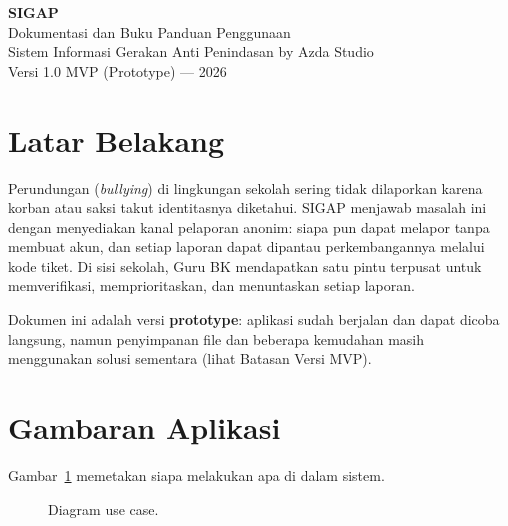 \documentclass[12pt,a4paper]{article}
\begin{document}
\thispagestyle{empty}
\begin{center}
  \vspace*{1cm}
  {\fontsize{44}{48}\selectfont \textbf{SIGAP}}\\[0.5cm]
  {\LARGE Dokumentasi dan Buku Panduan Penggunaan}\\[0.4cm]
  {\large Sistem Informasi Gerakan Anti Penindasan}
  \vfill
  {\large by Azda Studio}\\[0.2cm]
  {\normalsize Versi 1.0 MVP (Prototype) --- 2026}
\end{center}
\clearpage

\tableofcontents
\clearpage

\section{Latar Belakang}
Perundungan (\textit{bullying}) di lingkungan sekolah sering tidak dilaporkan
karena korban atau saksi takut identitasnya diketahui. SIGAP menjawab masalah
ini dengan menyediakan kanal pelaporan anonim: siapa pun dapat melapor tanpa
membuat akun, dan setiap laporan dapat dipantau perkembangannya melalui kode
tiket. Di sisi sekolah, Guru BK mendapatkan satu pintu terpusat untuk
memverifikasi, memprioritaskan, dan menuntaskan setiap laporan.

Dokumen ini adalah versi \textbf{prototype}: aplikasi sudah berjalan dan dapat
dicoba langsung, namun penyimpanan file dan beberapa kemudahan masih
menggunakan solusi sementara (lihat Batasan Versi MVP).

\section{Gambaran Aplikasi}
Gambar~\ref{fig:usecase} memetakan siapa melakukan apa di dalam sistem.

\begin{figure}[h]
\centering
{}
\caption{Diagram use case.}
\label{fig:usecase}
\end{figure}
\end{document}
